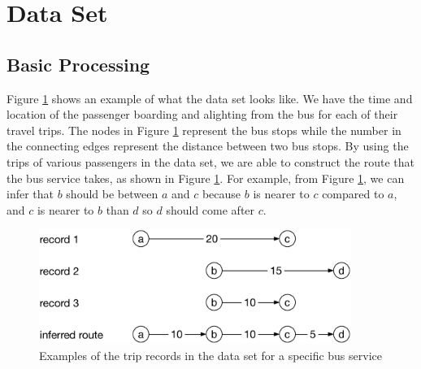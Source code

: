 \documentclass{sig-alternate}
\begin{document}



\section{Data Set}

\subsection{Basic Processing}

Figure \ref{fig:trip_example} shows an example of what the data set looks like. We have the time and location of the passenger boarding and alighting from the bus for each of their travel trips. The nodes in Figure \ref{fig:trip_example} represent the bus stops while the number in the connecting edges represent the distance between two bus stops. By using the trips of various passengers in the data set, we are able to construct the route that the bus service takes, as shown in Figure \ref{fig:trip_example}. For example, from Figure \ref{fig:trip_example}, we can infer that $b$ should be between $a$ and $c$ because $b$ is nearer to $c$ compared to $a$, and $c$ is nearer to $b$ than $d$ so $d$ should come after $c$.

\begin{figure}[htb]
	\centering
	\includegraphics[width=4.0in]{trip_example}
	\caption{Examples of the trip records in the data set for a specific bus service}
	\label{fig:trip_example}
\end{figure}
\end{document}
